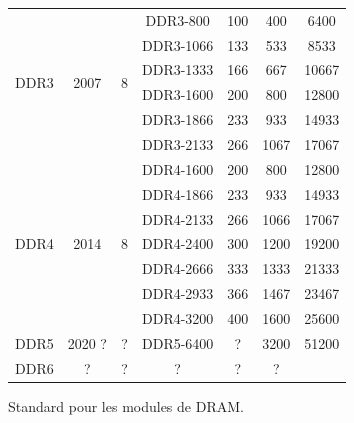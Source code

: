 \begin{figure}
\begin{tabular}{|c|c|c|c|c|c|c|}
  \multirow{6}{*}{DDR3} & \multirow{6}{*}{2007} & \multirow{6}{*}{8} & DDR3-800   & 100               & 400             &  6400 \\
                        &                       &                    & DDR3-1066  & 133               & 533             &  8533 \\
                        &                       &                    & DDR3-1333  & 166               & 667             & 10667 \\
                        &                       &                    & DDR3-1600  & 200               & 800             & 12800 \\
                        &                       &                    & DDR3-1866  & 233               & 933             & 14933 \\
                        &                       &                    & DDR3-2133  & 266               & 1067            & 17067 \\
  \hline                                                                                            
  \multirow{7}{*}{DDR4} & \multirow{7}{*}{2014} & \multirow{7}{*}{8} & DDR4-1600  & 200               & 800             & 12800 \\
                        &                       &                    & DDR4-1866  & 233               & 933             & 14933 \\
                        &                       &                    & DDR4-2133  & 266               & 1066            & 17067 \\
                        &                       &                    & DDR4-2400  & 300               & 1200            & 19200 \\
                        &                       &                    & DDR4-2666  & 333               & 1333            & 21333 \\
                        &                       &                    & DDR4-2933  & 366               & 1467            & 23467 \\
                        &                       &                    & DDR4-3200  & 400               & 1600            & 25600 \\
  \hline                                                                                            
  DDR5                  & 2020 ?                & ?                  & DDR5-6400  & ?                 & 3200            & 51200 \\
  \hline                                                                                            
  DDR6                  & ?                     & ?                  & ?          & ?                 & ?               & \\
  \hline
\end{tabular}
\caption{Standard pour les modules de DRAM. \label{tab:DDR}}
\end{figure}

